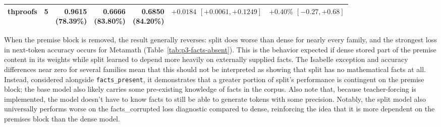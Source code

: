 \documentclass{article}
\begin{document}
\begin{table}[!htbp]
\begin{tabular*}{\textwidth}{@{\extracolsep{\fill}}lrrrrrr}
thproofs & 5   & \shortstack{0.9615\\(78.39\%)} & \shortstack{0.6666\\(83.80\%)} & \shortstack{0.6850\\(84.20\%)} & \shortstack{$+0.0184$\\$[+0.0061,+0.1249]$} & \shortstack{$+0.40\%$\\$[-0.27,+0.68]$} \\
\bottomrule
\end{tabular*}
\end{table}

When the premise block is removed, the result generally reverses: split does worse than dense for nearly every family, and the strongest loss in next-token accuracy occurs for Metamath (Table~\ref{tab:p3-facts-absent}). This is the behavior expected if dense stored part of the premise content in its weights while split learned to depend more heavily on externally supplied facts. The Isabelle exception and accuracy differences near zero for several families mean that this should not be interpreted as showing that split has no mathematical facts at all. Instead, considered alongside \texttt{facts\_present}, it demonstrates that a greater portion of split's performance is contingent on the premise block; the base model also likely carries some pre-existing knowledge of facts in the corpus. Also note that, because teacher-forcing is implemented, the model doesn't have to know facts to still be able to generate tokens with some precision. Notably, the split model also universally performs worse on the facts\_corrupted loss diagnostic compared to dense, reinforcing the idea that it is more dependent on the premises block than the dense model.
\end{document}
